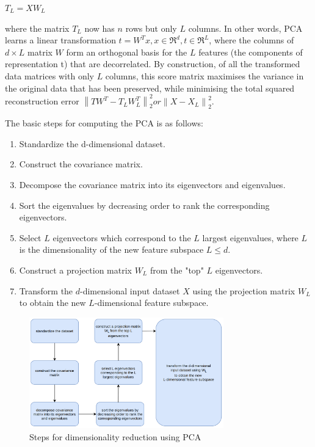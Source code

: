 $T_L = XW_L$


where the matrix $T_L$ now has $n$ rows but only $L$ columns. In other words, PCA learns a linear transformation 
$t = W^{T}x, x \in \Re^{d}, t \in \Re^{L}$, where the columns of $d \times L$ matrix $W$ form an orthogonal basis for the $L$ features (the components of representation t) that are decorrelated. By construction, of all the transformed data matrices with only $L$ columns, this score matrix maximises the variance in the original data that has been preserved, while minimising the total squared reconstruction error $\left \| TW^T - T_LW_L^T\right \|_2^2 or \left \| X - X_L \right \|_2^2$.

The basic steps for computing the PCA is as follows:

\begin{enumerate}
    \item Standardize the d-dimensional dataset.
    \item Construct the covariance matrix.
    \item Decompose the covariance matrix into its eigenvectors and eigenvalues.
    \item Sort the eigenvalues by decreasing order to rank the corresponding eigenvectors.
    \item Select $L$ eigenvectors which correspond to the $L$ largest eigenvalues, where $L$ is the dimensionality of the new feature subspace $L \leq d$.
    \item Construct a projection matrix $W_L$ from the "top" $L$ eigenvectors.
    \item Transform the $d$-dimensional input dataset $X$ using the projection matrix $W_L$ to obtain the new $L$-dimensional feature subspace.
\end{enumerate}

\vspace{1em}

\begin{figure}[!ht]
    \label{fig:dimensionalityReductionSteps}
    \centering
    \includegraphics[width=0.75\textwidth]{../fig/chapter5/dimensionalityReductionUsingPCA.png}
    \caption{Steps for dimensionality reduction using PCA}
\end{figure}


